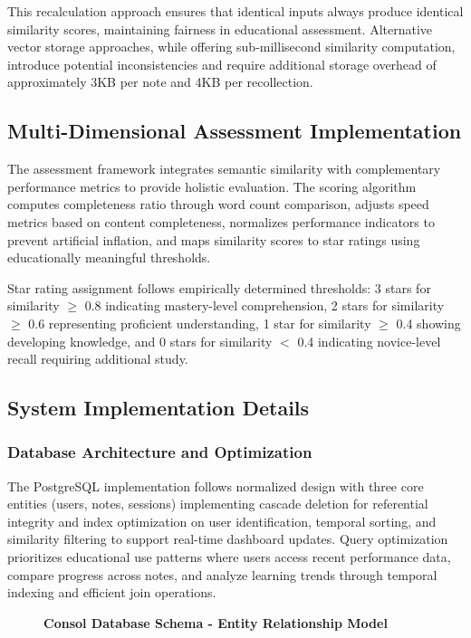 {This recalculation approach ensures that identical inputs always produce identical similarity scores, maintaining fairness in educational assessment. Alternative vector storage approaches, while offering sub-millisecond similarity computation, introduce potential inconsistencies and require additional storage overhead of approximately 3KB per note and 4KB per recollection.

\subsection{Multi-Dimensional Assessment Implementation}

The assessment framework integrates semantic similarity with complementary performance metrics to provide holistic evaluation. The scoring algorithm computes completeness ratio through word count comparison, adjusts speed metrics based on content completeness, normalizes performance indicators to prevent artificial inflation, and maps similarity scores to star ratings using educationally meaningful thresholds.

Star rating assignment follows empirically determined thresholds: 3 stars for similarity $\geq$ 0.8 indicating mastery-level comprehension, 2 stars for similarity $\geq$ 0.6 representing proficient understanding, 1 star for similarity $\geq$ 0.4 showing developing knowledge, and 0 stars for similarity $<$ 0.4 indicating novice-level recall requiring additional study.

\subsection{System Implementation Details}

\subsubsection{Database Architecture and Optimization}

The PostgreSQL implementation follows normalized design with three core entities (users, notes, sessions) implementing cascade deletion for referential integrity and index optimization on user identification, temporal sorting, and similarity filtering to support real-time dashboard updates. Query optimization prioritizes educational use patterns where users access recent performance data, compare progress across notes, and analyze learning trends through temporal indexing and efficient join operations.

\begin{figure}[H]
\centering
\begin{minipage}{\textwidth}
\centering
\textbf{Consol Database Schema - Entity Relationship Model}
\vspace{0.5cm}


\end{minipage}
\end{figure}}
